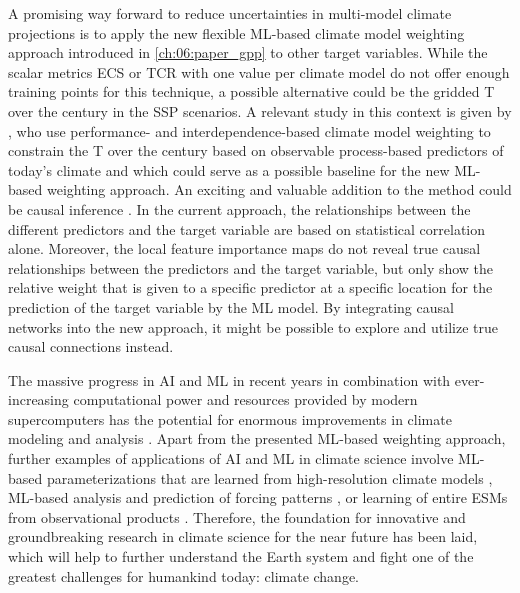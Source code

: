 A promising way forward to reduce uncertainties in multi-model climate
projections is to apply the new flexible \acs{ML}-based climate model weighting
approach introduced in \cref{ch:06:paper_gpp} to other target variables. While
the scalar metrics \ac{ECS} or \ac{TCR} with one value per climate model do not
offer enough training points for this technique, a possible alternative could
be the gridded \acl{T} over the  century in the \ac{SSP} scenarios. A
relevant study in this context is given by \textcite{Brunner2020}, who use
performance- and interdependence-based climate model weighting to constrain the
\acl{T} over the  century based on observable process-based predictors
of today's climate and which could serve as a possible baseline for the new
\acs{ML}-based weighting approach. An exciting and valuable addition to the
method could be causal inference \autocite{Nowack2020, Runge2019}. In the
current approach, the relationships between the different predictors and the
target variable are based on statistical correlation alone. Moreover, the local
feature importance maps do not reveal true causal relationships between the
predictors and the target variable, but only show the relative weight that is
given to a specific predictor at a specific location for the prediction of the
target variable by the \ac{ML} model. By integrating causal networks into the
new approach, it might be possible to explore and utilize true causal
connections instead.

The massive progress in \ac{AI} and \ac{ML} in recent years in combination with
ever-increasing computational power and resources provided by modern
supercomputers has the potential for enormous improvements in climate modeling
and analysis \autocite{Reichstein2019}. Apart from the presented \acs{ML}-based
weighting approach, further examples of applications of \ac{AI} and \ac{ML} in
climate science involve \acs{ML}-based parameterizations that are learned from
high-resolution climate models \autocite{Gentine2018, Rasp2018}, \acs{ML}-based
analysis and prediction of forcing patterns \autocite{Barnes2019,
  Mansfield2020}, or learning of entire \acp{ESM} from observational products
\autocite{Geer2021}. Therefore, the foundation for innovative and
groundbreaking research in climate science for the near future has been laid,
which will help to further understand the Earth system and fight one of the
greatest challenges for humankind today: climate change.
